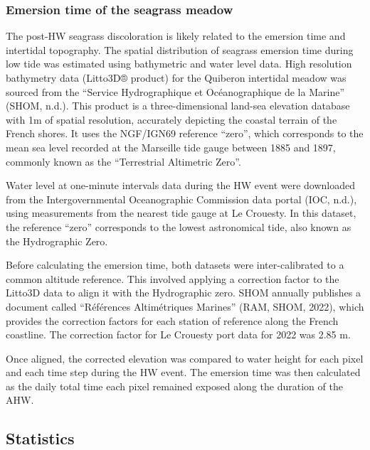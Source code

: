 \documentclass[
  letterpaper,
  11pt,
  english,
  singlespacing,
  headsepline]{MastersDoctoralThesis}
\begin{document}
\begin{spacing}{1.5}
\subsubsection{Emersion time of the seagrass
meadow}\label{emersion-time-of-the-seagrass-meadow}

The post-HW seagrass discoloration is likely related to the emersion
time and intertidal topography. The spatial distribution of seagrass
emersion time during low tide was estimated using bathymetric and water
level data. High resolution bathymetry data (Litto3D® product) for the
Quiberon intertidal meadow was sourced from the ``Service Hydrographique
et Océanographique de la Marine'' (SHOM, n.d.). This product is a
three-dimensional land-sea elevation database with 1m of spatial
resolution, accurately depicting the coastal terrain of the French
shores. It uses the NGF/IGN69 reference ``zero'', which corresponds to
the mean sea level recorded at the Marseille tide gauge between 1885 and
1897, commonly known as the ``Terrestrial Altimetric Zero''.

Water level at one-minute intervals data during the HW event were
downloaded from the Intergovernmental Oceanographic Commission data
portal (IOC, n.d.), using measurements from the nearest tide gauge at Le
Crouesty. In this dataset, the reference ``zero'' corresponds to the
lowest astronomical tide, also known as the Hydrographic Zero.

Before calculating the emersion time, both datasets were
inter-calibrated to a common altitude reference. This involved applying
a correction factor to the Litto3D data to align it with the
Hydrographic zero. SHOM annually publishes a document called
``Références Altimétriques Marines'' (RAM, SHOM, 2022), which provides
the correction factors for each station of reference along the French
coastline. The correction factor for Le Crouesty port data for 2022 was
2.85 m.

Once aligned, the corrected elevation was compared to water height for
each pixel and each time step during the HW event. The emersion time was
then calculated as the daily total time each pixel remained exposed
along the duration of the AHW.

\subsection{Statistics}\label{statistics}


\end{spacing}
\end{document}
